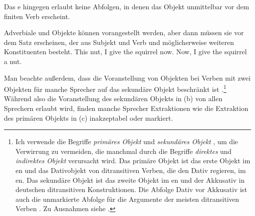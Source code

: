 Das e hingegen erlaubt keine Abfolgen, in denen das Objekt unmittelbar vor dem
finiten Verb erscheint.

\eal
{}
\zl
Adverbiale und Objekte können vorangestellt werden, aber dann müssen sie vor dem Satz erscheinen, der aus
Subjekt und Verb und möglicherweise weiteren Konstituenten besteht.
\eal
\ex This nut, I give the squirrel now.
\ex Now, I give the squirrel a nut.
\zl

\noindent
Man beachte außerdem, dass die Voranstellung von Objekten bei Verben mit zwei Objekten für manche Sprecher auf das sekundäre Objekt
beschränkt ist \citep[]{Hudson92a-u}.\footnote{
  Ich verwende die Begriffe \emph{primäres Objekt} und \emph{sekundäres
    Objekt} \citep[280]{PS92a}, um die Verwirrung zu vermeiden, die manchmal
  durch die Begriffe \emph{direktes} und \emph{indirektes Objekt} verursacht wird. Das primäre Objekt ist das erste Objekt im en
  und das Dativobjekt von ditransitiven Verben, die den Dativ regieren, im en. Das sekundäre Objekt
  ist das zweite Objekt im en und der Akkusativ in deutschen ditransitiven Konstruktionen. Die Abfolge
  Dativ vor Akkusativ ist auch die unmarkierte Abfolge für die Argumente der meisten ditransitiven Verben
  \citep{Hoehle82a}. Zu Ausnahmen siehe .
} Während also die Voranstellung des sekundären Objekts in
(b) von allen Sprechern erlaubt wird, finden manche Sprecher Extraktionen wie die Extraktion des
primären Objekts in (c) inakzeptabel oder markiert.

